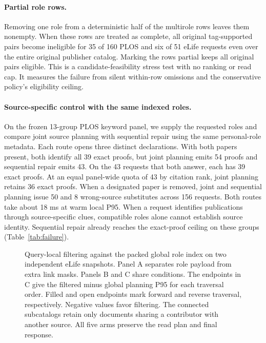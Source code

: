 \documentclass[sigconf,natbib=true,anonymous=true,pbalance=true]{acmart}
\begin{document}
\paragraph{Partial role rows.}
Removing one role from a deterministic half of the multirole rows leaves them nonempty. When these rows are treated as complete, all original tag-supported pairs become ineligible for 35 of 160 PLOS and six of 51 eLife requests even over the entire original publisher catalog. Marking the rows partial keeps all original pairs eligible. This is a candidate-feasibility stress test with no ranking or read cap. It measures the failure from silent within-row omissions and the conservative policy's eligibility ceiling.

\paragraph{Source-specific control with the same indexed roles.}
On the frozen 13-group PLOS keyword panel, we supply the requested roles and compare joint source planning with sequential repair using the same personal-role metadata. Each route opens three distinct declarations. With both papers present, both identify all 39 exact proofs, but joint planning emits 54 proofs and sequential repair emits 43. On the 43 requests that both answer, each has 39 exact proofs. At an equal panel-wide quota of 43 by citation rank, joint planning retains 36 exact proofs. When a designated paper is removed, joint and sequential planning issue 50 and 8 wrong-source substitutes across 156 requests. Both routes take about 18 ms at warm local P95. When a request identifies publications through source-specific clues, compatible roles alone cannot establish source identity. Sequential repair already reaches the exact-proof ceiling on these groups (Table~\ref{tab:failure}).

\begin{figure}[t]
\centering

\caption{Query-local filtering against the packed global role index on two independent eLife snapshots. Panel A separates role payload from extra link masks. Panels B and C share conditions. The endpoints in C give the filtered minus global planning P95 for each traversal order. Filled and open endpoints mark forward and reverse traversal, respectively. Negative values favor filtering. The connected subcatalogs retain only documents sharing a contributor with another source. All five arms preserve the read plan and final response.}
\label{fig:linked-tradeoffs}
\end{figure}
\end{document}
